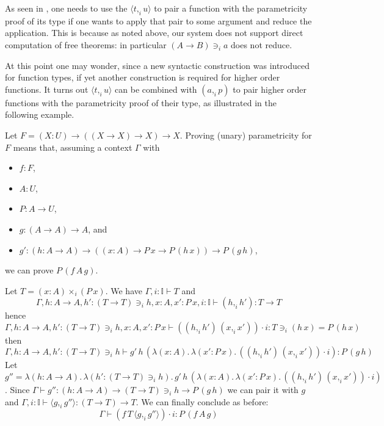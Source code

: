 \documentclass[english]{PaperTools/latex/lipics}
\newcommand\CP[3]{(#2,_{#1} #3)}
\newcommand\CTimes[2]{(#2) ×_{#1}}
\newcommand\param[1]{\!\cdot\!#1}
\newcommand\op[1]{∋_{#1}}
\newcommand\fp[3]{⟨#2 ,_{#1} #3⟩}
\begin{document}
As seen in , one needs to use the
$\fp i t u$ to pair a function with the parametricity proof of its type
if one wants to apply that pair to some argument and reduce the
application.  This is because as noted above, our system does not
support direct computation of free theorems: in particular $(A → B) \op i a$
does not reduce.

At this point one may wonder, since a new syntactic construction was
introduced for function types, if yet another construction is required
for higher order functions.  It turns out $\fp i t u$ can be combined
with $\CP i a p$ to pair higher order functions with the parametricity
proof of their type, as illustrated in the following example.

\begin{example}
  Let $F = (X : U) → ((X → X) → X) → X$.
  Proving (unary) parametricity for $F$ means that, assuming a context $Γ$ with
  \begin{itemize}
    \item $f : F$,
    \item $A : U$,
    \item $P : A → U$,
    \item $g : (A → A) → A$, and
    \item $g' : (h : A → A) → ((x : A) → P\, x → P\, (h\, x)) → P\, (g\, h)$,
  \end{itemize}
  we can prove $P\, (f\, A\, g)$.

  Let $T = \CTimes i {x:A} {(P\,x)}$.
  We have $Γ, i:𝕀 ⊢ T$ and
  $$Γ, h:A → A, h': (T → T) \op i h, x : A, x' : P\, x, i:𝕀 ⊢ \CP i h {h'} : T → T$$
  hence
  $$Γ, h:A → A, h': (T → T) \op i h, x : A, x' : P\, x ⊢ (\CP i h {h'}\, \CP i x {x'}) \param i : T \op i (h\, x) = P\, (h\, x)$$
  then
  $$Γ, h:A → A, h': (T → T) \op i h ⊢ g'\, h\, (λ (x : A).\, λ (x' : P\, x).\, (\CP i h {h'}\, \CP i x {x'}) \param i) : P\, (g\, h)
  $$
  Let $g'' = λ (h:A → A).\, λ (h': (T → T) \op i h).\, g'\, h\, (λ (x : A).\, λ (x' : P\, x).\, (\CP i h {h'}\, \CP i x {x'}) \param i)$.
  Since $Γ ⊢ g'' : (h:A → A) → (T → T) \op i h → P\, (g\, h)$
  we can pair it with $g$ and
  $Γ, i:𝕀 ⊢ \fp i g {g''} : (T → T) → T$. We can finally conclude as before:
  $$Γ ⊢ (f\, T\, \fp i g {g''}) \param i : P\, (f\, A\, g)$$
\end{example}
\end{document}
